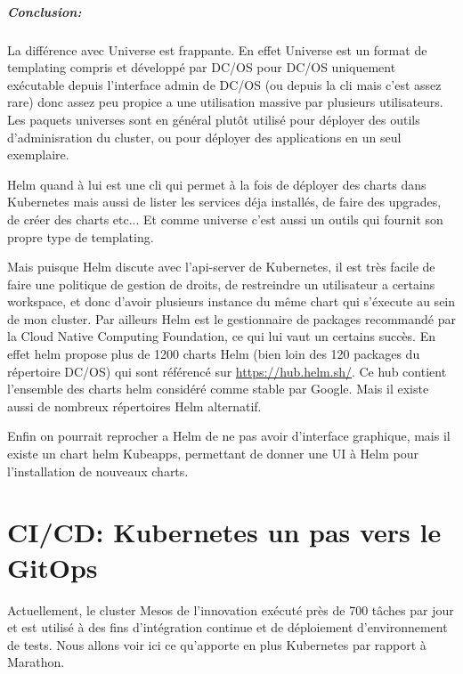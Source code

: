\documentclass[11pt,fleqn]{book} %
\begin{document}
\begin{interrupt}
\paragraph{Conclusion:}
La différence avec Universe est frappante. En effet Universe est un format de templating compris et développé par DC/OS pour DC/OS uniquement exécutable depuis l'interface admin de DC/OS (ou depuis la cli mais c'est assez rare) donc assez peu propice a une utilisation massive par plusieurs utilisateurs. Les paquets universes sont en général plutôt utilisé pour déployer des outils d'adminisration du cluster, ou pour déployer des applications en un seul exemplaire. \newline 

Helm quand à lui est une cli qui permet à la fois de déployer des charts dans Kubernetes mais aussi de lister les services déja installés, de faire des upgrades, de créer des charts etc... Et comme universe c'est aussi un outils qui fournit son propre type de templating.\newline

Mais puisque Helm discute avec l'api-server de Kubernetes, il est très facile de faire une politique de gestion de droits, de restreindre un utilisateur a certains workspace, et donc d'avoir plusieurs instance du même chart qui s'éxecute au sein de mon cluster. Par ailleurs Helm est le gestionnaire de packages recommandé par la Cloud Native Computing Foundation, ce qui lui vaut un certains succès. En effet helm propose plus de 1200 charts Helm (bien loin des 120 packages du répertoire DC/OS) qui sont référencé sur \url{https://hub.helm.sh/}. Ce hub contient l'ensemble des charts helm considéré comme stable par Google. Mais il existe aussi de nombreux répertoires Helm alternatif.\newline

Enfin on pourrait reprocher a Helm de ne pas avoir d'interface graphique, mais il existe un chart helm Kubeapps, permettant de donner une UI à Helm pour l'installation de nouveaux charts. 
\end{interrupt}







\chapter{CI/CD: Kubernetes un pas vers le GitOps}
\vspace{-2cm}
Actuellement, le cluster Mesos de l'innovation exécuté près de 700 tâches par jour et est utilisé à des fins d'intégration continue et de déploiement d'environnement de tests. Nous allons voir ici ce qu'apporte en plus Kubernetes par rapport à Marathon.
\end{document}
